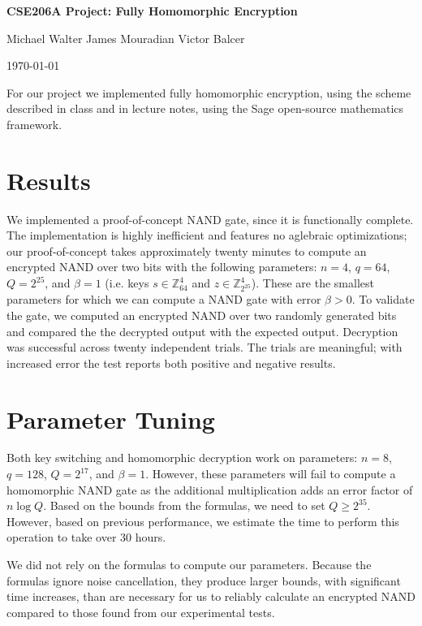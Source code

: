 \documentclass{article}
\begin{document}
\centerline{\LARGE{\bf{CSE206A Project: Fully Homomorphic Encryption}}}
\vspace{12.0pt}
\centerline{Michael Walter \hspace{0.1in} James Mouradian \hspace{0.1in} Victor Balcer}
\vspace{4.0pt}
\centerline{\today}
\vspace{14.0pt}

For our project we implemented fully homomorphic encryption, using the scheme
described in class and in lecture notes, using the Sage open-source mathematics
framework.

\section{Results}

We implemented a proof-of-concept NAND gate, since it is functionally complete.
The implementation is highly inefficient and features no aglebraic
optimizations; our proof-of-concept takes approximately twenty minutes to
compute an encrypted NAND over two bits with the following parameters: $n=4$,
$q=64$, $Q=2^{25}$, and $\beta = 1$ (i.e. keys $s\in \mathbb{Z}_{64}^4$ and
$z\in\mathbb{Z}_{2^{25}}^4$). These are the smallest parameters for which we
can compute a NAND gate with error $\beta > 0$. To validate the gate, we
computed an encrypted NAND over two randomly generated bits and compared the
the decrypted output with the expected output. Decryption was successful across
twenty independent trials. The trials are meaningful; with increased error
the test reports both positive and negative results.

\section{Parameter Tuning}

Both key switching and homomorphic decryption work on parameters: $n=8$,
$q=128$, $Q=2^{17}$, and $\beta=1$. However, these parameters will fail to
compute a homomorphic NAND gate as the additional multiplication adds an error
factor of $n\log{Q}$. Based on the bounds from the formulas, we need to set
$Q \ge 2^{35}$. However, based on previous performance, we estimate the time
to perform this operation to take over 30 hours.

We did not rely on the formulas to compute our parameters. Because the formulas
ignore noise cancellation, they produce larger bounds, with significant time increases,
than are necessary for us to reliably calculate an encrypted NAND compared to those
found from our experimental tests.
\end{document}

